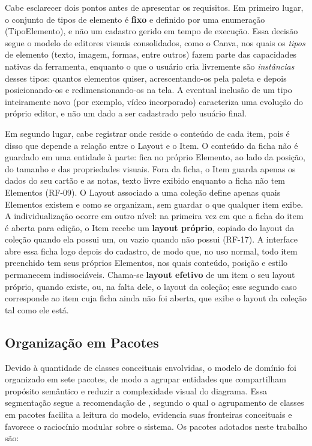 Cabe esclarecer dois pontos antes de apresentar os requisitos. Em primeiro lugar, o conjunto de tipos de elemento é \textbf{fixo} e definido por uma enumeração (TipoElemento),
e não um cadastro gerido em tempo de execução. Essa decisão segue o modelo de editores visuais consolidados, como o Canva, nos quais os \textit{tipos} de elemento 
(texto, imagem, formas, entre outros) fazem parte das capacidades nativas da ferramenta, enquanto o que o usuário cria livremente são \textit{instâncias} desses tipos:
quantos elementos quiser, acrescentando-os pela paleta e depois posicionando-os e redimensionando-os na tela. A eventual inclusão de um tipo inteiramente novo (por exemplo, vídeo incorporado)
caracteriza uma evolução do próprio editor, e não um dado a ser cadastrado pelo usuário final.

Em segundo lugar, cabe registrar onde reside o conteúdo de cada item, pois é disso que depende a relação entre o Layout e o Item. O conteúdo da ficha não é guardado
em uma entidade à parte: fica no próprio Elemento, ao lado da posição, do tamanho e das propriedades visuais. Fora da ficha, o Item guarda apenas os dados do
seu cartão e as notas, texto livre exibido enquanto a ficha não tem Elementos (RF-09). O Layout associado a uma coleção define apenas
quais Elementos existem e como se organizam, sem guardar o que qualquer item exibe. A individualização ocorre em outro nível: na primeira vez em que a
ficha do item é aberta para edição, o Item recebe um \textbf{layout próprio}, copiado do layout da coleção quando ela possui um, ou vazio quando não
possui (RF-17). A interface abre essa ficha logo depois do cadastro, de modo que, no uso normal, todo item preenchido tem seus próprios Elementos, nos
quais conteúdo, posição e estilo permanecem indissociáveis. Chama-se \textbf{layout efetivo} de um item o seu layout próprio, quando existe, ou, na falta
dele, o layout da coleção; esse segundo caso corresponde ao item cuja ficha ainda não foi aberta, que exibe o layout da coleção tal como ele está.

\subsection{Organização em Pacotes}
\label{subsec:pacotes_dominio}

Devido à quantidade de classes conceituais envolvidas, o modelo de domínio foi organizado em sete pacotes, de modo a agrupar entidades que compartilham propósito semântico e
reduzir a complexidade visual do diagrama. Essa segmentação segue a recomendação de \cite{Larman2007}, segundo o qual o agrupamento de classes em pacotes facilita a leitura do modelo, 
evidencia suas fronteiras conceituais e favorece o raciocínio modular sobre o sistema. Os pacotes adotados neste trabalho são:

